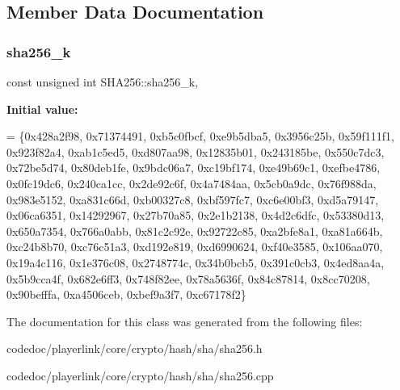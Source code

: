 \subsection{Member Data Documentation}
\mbox{\label{classSHA256_ab21ac6c6f796a614ee11b94a9ccf3a5c}} 
\subsubsection{\texorpdfstring{sha256\+\_\+k}{sha256\_k}}
{\footnotesize\ttfamily const unsigned int S\+H\+A256\+::sha256\+\_\+k\hspace{0.3cm}{\ttfamily [static]}, {\ttfamily [protected]}}

{\bfseries Initial value\+:}
\begin{DoxyCode}
= 
        \{0x428a2f98, 0x71374491, 0xb5c0fbcf, 0xe9b5dba5,
         0x3956c25b, 0x59f111f1, 0x923f82a4, 0xab1c5ed5,
         0xd807aa98, 0x12835b01, 0x243185be, 0x550c7dc3,
         0x72be5d74, 0x80deb1fe, 0x9bdc06a7, 0xc19bf174,
         0xe49b69c1, 0xefbe4786, 0x0fc19dc6, 0x240ca1cc,
         0x2de92c6f, 0x4a7484aa, 0x5cb0a9dc, 0x76f988da,
         0x983e5152, 0xa831c66d, 0xb00327c8, 0xbf597fc7,
         0xc6e00bf3, 0xd5a79147, 0x06ca6351, 0x14292967,
         0x27b70a85, 0x2e1b2138, 0x4d2c6dfc, 0x53380d13,
         0x650a7354, 0x766a0abb, 0x81c2c92e, 0x92722c85,
         0xa2bfe8a1, 0xa81a664b, 0xc24b8b70, 0xc76c51a3,
         0xd192e819, 0xd6990624, 0xf40e3585, 0x106aa070,
         0x19a4c116, 0x1e376c08, 0x2748774c, 0x34b0bcb5,
         0x391c0cb3, 0x4ed8aa4a, 0x5b9cca4f, 0x682e6ff3,
         0x748f82ee, 0x78a5636f, 0x84c87814, 0x8cc70208,
         0x90befffa, 0xa4506ceb, 0xbef9a3f7, 0xc67178f2\}
\end{DoxyCode}


The documentation for this class was generated from the following files\+:\begin{DoxyCompactItemize}
\item 
codedoc/playerlink/core/crypto/hash/sha/sha256.\+h\item 
codedoc/playerlink/core/crypto/hash/sha/sha256.\+cpp\end{DoxyCompactItemize}
